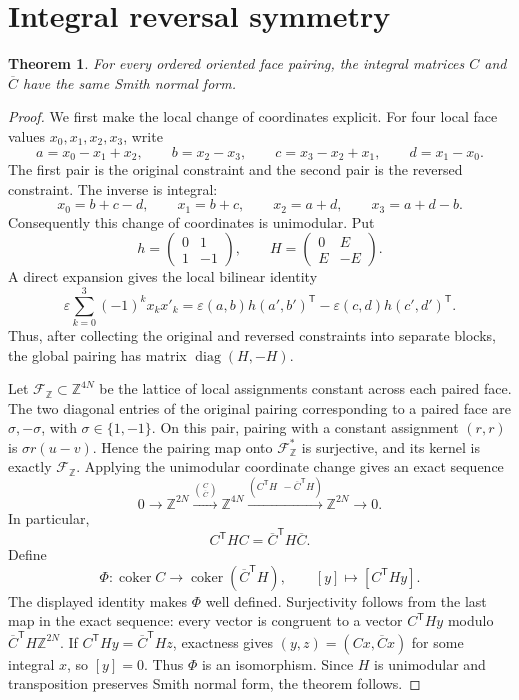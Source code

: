 \documentclass[11pt]{article}
\newtheorem{theorem}{Theorem}[section]
\theoremstyle{definition}\newtheorem{definition}[theorem]{Definition}
\theoremstyle{remark}\newtheorem{remark}[theorem]{Remark}
\DeclareMathOperator{\coker}{coker}
\DeclareMathOperator{\diag}{diag}
\newcommand{\Z}{\mathbb Z}
\newcommand{\Ct}{\overline C}
\newcommand{\eps}{\varepsilon}
\begin{document}
\section{Integral reversal symmetry}\label{sec:reversal}

\begin{theorem}\label{thm:integral-reversal}
For every ordered oriented face pairing, the integral matrices $C$ and
$\Ct$ have the same Smith normal form.
\end{theorem}
\begin{proof}
We first make the local change of coordinates explicit. For four local
face values $x_0,x_1,x_2,x_3$, write
\[
 a=x_0-x_1+x_2,\qquad b=x_2-x_3,\qquad
 c=x_3-x_2+x_1,\qquad d=x_1-x_0.
\]
The first pair is the original constraint and the second pair is the
reversed constraint. The inverse is integral:
\[
 x_0=b+c-d,\qquad x_1=b+c,\qquad
 x_2=a+d,\qquad x_3=a+d-b.
\]
Consequently this change of coordinates is unimodular. Put
\[
 h=\begin{pmatrix}0&1\\1&-1\end{pmatrix},\qquad
 H=\begin{pmatrix}0&E\\E&-E\end{pmatrix}.
\]
A direct expansion gives the local bilinear identity
\[
 \eps\sum_{k=0}^3(-1)^k x_k x'_k
 =\eps(a,b)h(a',b')^{\mathsf T}
  -\eps(c,d)h(c',d')^{\mathsf T}.
\]
Thus, after collecting the original and reversed constraints into separate
blocks, the global pairing has matrix $\diag(H,-H)$.

Let $\mathscr F_{\Z}\subset\Z^{4N}$ be the lattice of local assignments
constant across each paired face. The two diagonal entries of the original
pairing corresponding to a paired face are $\sigma,-\sigma$, with
$\sigma\in\{1,-1\}$. On this pair, pairing with a constant assignment
$(r,r)$ is $\sigma r(u-v)$. Hence the pairing map onto
$\mathscr F_{\Z}^{*}$ is surjective, and its kernel is exactly
$\mathscr F_{\Z}$. Applying the unimodular coordinate change gives an
exact sequence
\[
 0\longrightarrow\Z^{2N}
 \xrightarrow{\binom C{\Ct}}\Z^{4N}
 \xrightarrow{(C^{\mathsf T}H\ \ -\Ct^{\mathsf T}H)}\Z^{2N}
 \longrightarrow0.
\]
In particular,
\[
 C^{\mathsf T}HC=\Ct^{\mathsf T}H\Ct.
\]
Define
\[
 \Phi:\coker C\longrightarrow\coker(\Ct^{\mathsf T}H),
 \qquad [y]\longmapsto[C^{\mathsf T}Hy].
\]
The displayed identity makes $\Phi$ well defined. Surjectivity follows
from the last map in the exact sequence: every vector is congruent to a
vector $C^{\mathsf T}Hy$ modulo $\Ct^{\mathsf T}H\Z^{2N}$. If
$C^{\mathsf T}Hy=\Ct^{\mathsf T}Hz$, exactness gives
$(y,z)=(Cx,\Ct x)$ for some integral $x$, so $[y]=0$. Thus $\Phi$ is an
isomorphism. Since $H$ is unimodular and transposition preserves Smith
normal form, the theorem follows.
\end{proof}
\end{document}
